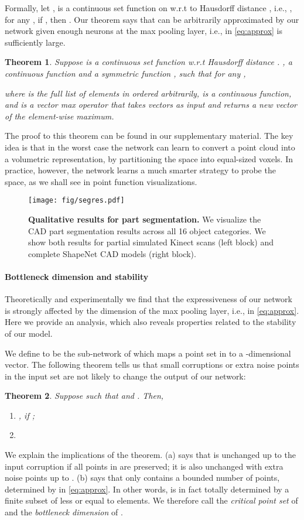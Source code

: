 \documentclass[10pt,twocolumn,letterpaper]{article}
\newtheorem{theorem}{Theorem}
\begin{document}
Formally, let ,    is a continuous set function on  w.r.t to Hausdorff distance , i.e., , for any , if , then . Our theorem says that  can be arbitrarily approximated by our network given enough neurons at the max pooling layer, i.e.,  in \eqref{eq:approx} is sufficiently large. 

\begin{theorem}
Suppose  is a continuous set function w.r.t Hausdorff distance . ,  a continuous function  and a symmetric function , such that for any ,

where  is the full list of elements in  ordered arbitrarily,  is a continuous function, and  is a vector max operator that takes  vectors as input and returns a new vector of the element-wise maximum. 
\end{theorem}
The proof to this theorem can be found in our supplementary material. The key idea is that in the worst case the network can learn to convert a point cloud into a volumetric representation, by partitioning the space into equal-sized voxels. In practice, however, the network learns a much smarter strategy to probe the space, as we shall see in point function visualizations.
\begin{figure}[t!]
    \centering
    \texttt{[image: fig/segres.pdf]}
    \caption{\textbf{Qualitative results for part segmentation.} We visualize the CAD part segmentation results across all 16 object categories. We show both results for partial simulated Kinect scans (left block) and complete ShapeNet CAD models (right block).}
    \label{fig:qualitative_part_segmentation}
\end{figure}

\paragraph{Bottleneck dimension and stability} Theoretically and experimentally we find that the expressiveness of our network is strongly affected by the dimension of the max pooling layer, i.e.,  in \eqref{eq:approx}. Here we provide an analysis, which also reveals properties related to the stability of our model. 

We define  to be the sub-network of  which maps a point set in  to a -dimensional vector. The following theorem tells us that small corruptions or extra noise points in the input set are not likely to change the output of our network:
\begin{theorem}
Suppose  such that  and . Then, 
\begin{enumerate}[label=(\alph*)]   
    \item ,   if  ;
\item 
\end{enumerate}
\label{thm:thm2}
\end{theorem}
We explain the implications of the theorem. (a) says that  is unchanged up to the input corruption if all points in  are preserved; it is also unchanged with extra noise points up to . (b) says that  only contains a bounded number of points, determined by  in \eqref{eq:approx}. In other words,  is in fact totally determined by a finite subset  of less or equal to  elements. We therefore call  the \emph{critical point set} of  and  the \emph{bottleneck dimension} of . 
\end{document}
